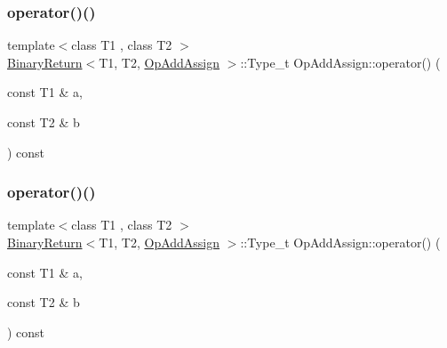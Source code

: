 \subsubsection{\texorpdfstring{operator()()}{operator()()}\hspace{0.1cm}{\footnotesize\ttfamily [1/3]}}
{\footnotesize\ttfamily template$<$class T1 , class T2 $>$ \\
\mbox{\hyperlink{structBinaryReturn}{Binary\+Return}}$<$T1, T2, \mbox{\hyperlink{structOpAddAssign}{Op\+Add\+Assign}} $>$\+::Type\+\_\+t Op\+Add\+Assign\+::operator() (\begin{DoxyParamCaption}\item[{const T1 \&}]{a,  }\item[{const T2 \&}]{b }\end{DoxyParamCaption}) const\hspace{0.3cm}{\ttfamily [inline]}}

\mbox{\label{structOpAddAssign_a804d22e657d15e33feee3d78d8d9f2a4}} 
\subsubsection{\texorpdfstring{operator()()}{operator()()}\hspace{0.1cm}{\footnotesize\ttfamily [2/3]}}
{\footnotesize\ttfamily template$<$class T1 , class T2 $>$ \\
\mbox{\hyperlink{structBinaryReturn}{Binary\+Return}}$<$T1, T2, \mbox{\hyperlink{structOpAddAssign}{Op\+Add\+Assign}} $>$\+::Type\+\_\+t Op\+Add\+Assign\+::operator() (\begin{DoxyParamCaption}\item[{const T1 \&}]{a,  }\item[{const T2 \&}]{b }\end{DoxyParamCaption}) const\hspace{0.3cm}{\ttfamily [inline]}}

\mbox{\label{structOpAddAssign_a804d22e657d15e33feee3d78d8d9f2a4}} 
